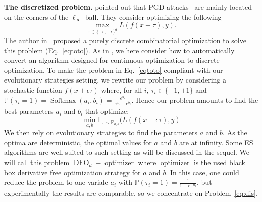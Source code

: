 \textbf{The discretized problem.} \cite{moon19aparsimonous} pointed out that PGD attacks~\citep{kurakin2016adversarial,madry2018towards} are mainly located on the corners of the $\ell_\infty$-ball. They consider optimizing the following
\begin{equation}
    \max_{\tau\in \{-\epsilon,+\epsilon\}^d}L(f(x+\tau),y).\label{eqtoto}
\end{equation}
The author in~\citep{moon19aparsimonous} proposed a purely discrete combinatorial optimization to solve this problem (Eq.~\ref{eqtoto}). 
As in \cite{ZophLe2017}, we here consider how to automatically convert an algorithm designed for continuous optimization to discrete optimization. To make the problem in Eq.~\ref{eqtoto} compliant with our evolutionary strategies setting, we rewrite our problem by considering a stochastic function $f(x+\epsilon\tau)$ where, for all $i$, $\tau_i\in\{-1,+1\}$ and $\mathbb{P}(\tau_i=1)=\operatorname{Softmax}(a_i,b_i)=\frac{e^{a_i}}{e^{a_i}+e^{b_i}}$. Hence our problem amounts to find the best parameters $a_i$ and $b_i$ that optimize:
\begin{equation}
\label{eq:dis}
    \min_{a,b} \mathbb{E}_{\tau\sim\mathbb{P}_{a,b}}(L(f(x+\epsilon\tau),y)
\end{equation}
We then rely on evolutionary strategies to find the parameters $a$ and $b$. As the optima are deterministic, the optimal values for $a$ and $b$ are at infinity. Some ES algorithms are well suited to such setting as will be discussed in the sequel. We will call this problem $\operatorname{DFO}_d-\operatorname{optimizer}$ where $\operatorname{optimizer}$ is the used black box derivative free optimization strategy for $a$ and $b$. In this case, one could reduce the problem to one variale $a_i$ with $\mathbb{P}(\tau_i=1)=\frac{1}{1+e^{-a_i}}$, but experimentally the results are comparable, so we concentrate on Problem~\ref{eq:dis}. %



